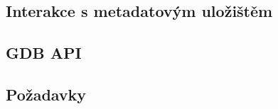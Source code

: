 
\subsection{Interakce s metadatovým uložištěm}
\label{sec:ana_interactions}








\subsection{GDB API} %

\subsection{Požadavky}


